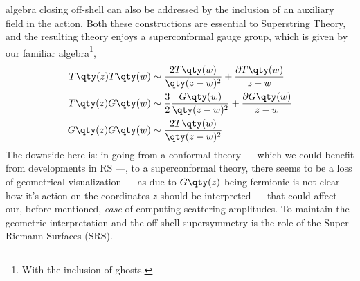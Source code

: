 algebra closing off-shell can also be addressed by the inclusion of an auxiliary field in the action. Both 
these constructions are essential to Superstring Theory, and the resulting theory enjoys a superconformal gauge 
group, which is given by our familiar algebra\footnote{With the inclusion of ghosts.},
\begin{align*}
    T\qty(z)T\qty(w)&\sim\frac{2T\qty(w)}{\qty(z-w)^2}+\frac{\partial T\qty(w)}{z-w}\\
    T\qty(z)G\qty(w)&\sim\frac32\frac{G\qty(w)}{\qty(z-w)^2}+\frac{\partial G\qty(w)}{z-w}\\
    G\qty(z)G\qty(w)&\sim\frac{2T\qty(w)}{\qty(z-w)^2}
\end{align*}
The downside here is: in going from a conformal theory --- which we could benefit from developments in RS ---, 
to a superconformal theory, there seems to be a loss of geometrical visualization --- as due to $G\qty(z)$ 
being fermionic is not clear how it's action on the coordinates $z$ should be interpreted --- that could affect our, before 
mentioned, \textit{ease} of computing scattering amplitudes. To maintain the geometric interpretation and 
the off-shell supersymmetry is the role of the Super Riemann Surfaces (SRS).